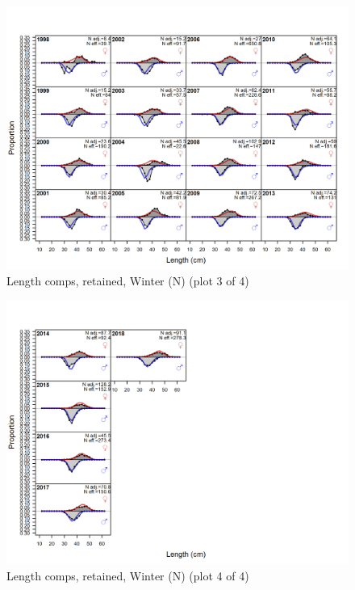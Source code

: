 \documentclass[12pt,]{article}
\begin{document}
\begin{figure}
\centering
\includegraphics{r4ss/plots_mod1/comp_lenfit_flt1mkt2_page3.png}
\caption{Length comps, retained, Winter (N) (plot 3 of 4)
\label{fig:length_fits}}
\end{figure}

\begin{figure}
\centering
\includegraphics{r4ss/plots_mod1/comp_lenfit_flt1mkt2_page4.png}
\caption{Length comps, retained, Winter (N) (plot 4 of 4)
\label{fig:length_fits}}
\end{figure}
\end{document}

